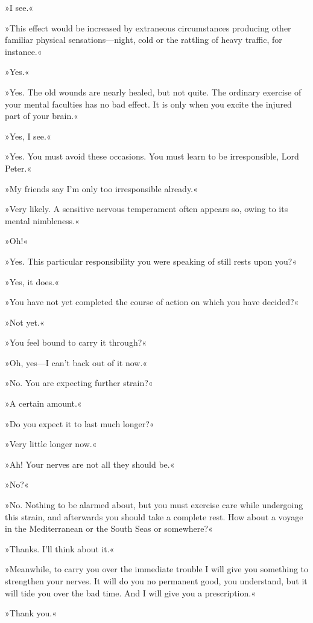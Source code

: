 »I see.«

»This effect would be increased by extraneous circumstances producing other familiar physical sensations\allowbreak---\allowbreak night, cold or the rattling of heavy traffic, for instance.«

»Yes.«

»Yes. The old wounds are nearly healed, but not quite. The ordinary exercise of your mental faculties has no bad effect. It is only when you excite the injured part of your brain.«

»Yes, I see.«

»Yes. You must avoid these occasions. You must learn to be irresponsible, Lord Peter.«

»My friends say I'm only too irresponsible already.«

»Very likely. A sensitive nervous temperament often appears so, owing to its mental nimbleness.«

»Oh!«

»Yes. This particular responsibility you were speaking of still rests upon you?«

»Yes, it does.«

»You have not yet completed the course of action on which you have decided?«

»Not yet.«

»You feel bound to carry it through?«

»Oh, yes\allowbreak---\allowbreak I can't back out of it now.«

»No. You are expecting further strain?«

»A certain amount.«

»Do you expect it to last much longer?«

»Very little longer now.«

»Ah! Your nerves are not all they should be.«

»No?«

»No. Nothing to be alarmed about, but you must exercise care while undergoing this strain, and afterwards you should take a complete rest. How about a voyage in the Mediterranean or the South Seas or somewhere?«

»Thanks. I'll think about it.«

»Meanwhile, to carry you over the immediate trouble I will give you something to strengthen your nerves. It will do you no permanent good, you understand, but it will tide you over the bad time. And I will give you a prescription.«

»Thank you.«

